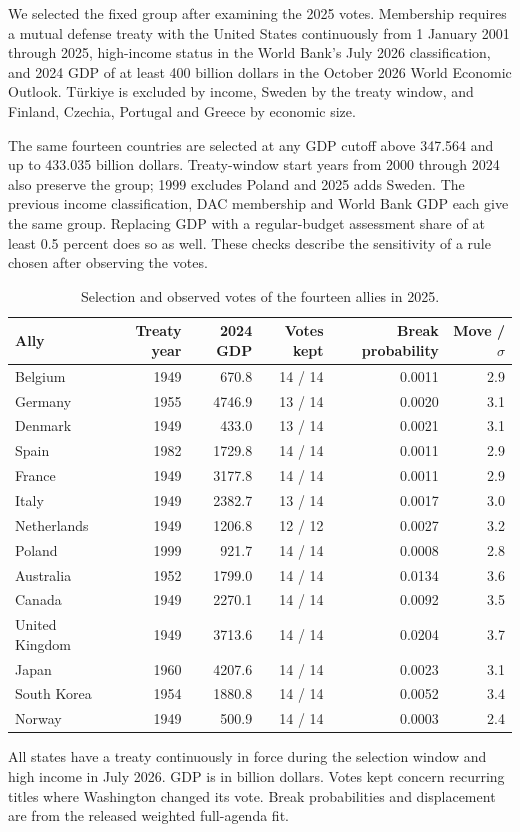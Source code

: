 \documentclass[10pt,authoryear]{elsarticle}
\begin{document}
We selected the fixed group after examining the 2025 votes. Membership requires a mutual defense treaty with the United States continuously from 1 January 2001 through 2025, high-income status in the World Bank’s July 2026 classification, and 2024 GDP of at least 400 billion dollars in the October 2026 World Economic Outlook. Türkiye is excluded by income, Sweden by the treaty window, and Finland, Czechia, Portugal and Greece by economic size.

The same fourteen countries are selected at any GDP cutoff above 347.564 and up to 433.035 billion dollars. Treaty-window start years from 2000 through 2024 also preserve the group; 1999 excludes Poland and 2025 adds Sweden. The previous income classification, DAC membership and World Bank GDP each give the same group. Replacing GDP with a regular-budget assessment share of at least 0.5 percent does so as well. These checks describe the sensitivity of a rule chosen after observing the votes.

\begin{table}[ht]
\centering\small
\caption{Selection and observed votes of the fourteen allies in 2025.}
\label{tab:allies_individual}
\begin{tabularx}{\textwidth}{>{\raggedright\arraybackslash}Xrrrrr}\toprule
Ally & Treaty year & 2024 GDP & Votes kept & Break probability & Move / $\sigma$\\\midrule
Belgium & 1949 & 670.8 & 14 / 14 & 0.0011 & 2.9\\
Germany & 1955 & 4746.9 & 13 / 14 & 0.0020 & 3.1\\
Denmark & 1949 & 433.0 & 13 / 14 & 0.0021 & 3.1\\
Spain & 1982 & 1729.8 & 14 / 14 & 0.0011 & 2.9\\
France & 1949 & 3177.8 & 14 / 14 & 0.0011 & 2.9\\
Italy & 1949 & 2382.7 & 13 / 14 & 0.0017 & 3.0\\
Netherlands & 1949 & 1206.8 & 12 / 12 & 0.0027 & 3.2\\
Poland & 1999 & 921.7 & 14 / 14 & 0.0008 & 2.8\\
Australia & 1952 & 1799.0 & 14 / 14 & 0.0134 & 3.6\\
Canada & 1949 & 2270.1 & 14 / 14 & 0.0092 & 3.5\\
United Kingdom & 1949 & 3713.6 & 14 / 14 & 0.0204 & 3.7\\
Japan & 1960 & 4207.6 & 14 / 14 & 0.0023 & 3.1\\
South Korea & 1954 & 1880.8 & 14 / 14 & 0.0052 & 3.4\\
Norway & 1949 & 500.9 & 14 / 14 & 0.0003 & 2.4\\
\bottomrule
\end{tabularx}
\begin{minipage}{\textwidth}\footnotesize All states have a treaty continuously in force during the selection window and high income in July 2026. GDP is in billion dollars. Votes kept concern recurring titles where Washington changed its vote. Break probabilities and displacement are from the released weighted full-agenda fit.\end{minipage}
\end{table}
\end{document}
